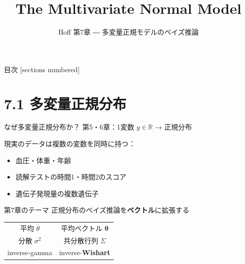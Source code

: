 \documentclass[lualatex,aspectratio=169,12pt]{beamer}
\title{The Multivariate Normal Model}
\subtitle{Hoff 第7章 ― 多変量正規モデルのベイズ推論}
\author{}
\date{}
\institute{}
\begin{document}
\maketitle

\begin{frame}{目次}
  [sections numbered]
  \tableofcontents
\end{frame}

\section{7.1 多変量正規分布}

\begin{frame}{なぜ多変量正規分布か？}
  第5・6章：1変数 $y \in \mathbb{R}$ → 正規分布

  \bigskip
  現実のデータは\alert{複数の変数}を同時に持つ：
  \begin{itemize}
    \item 血圧・体重・年齢
    \item 読解テストの時間1・時間2のスコア
    \item 遺伝子発現量の複数遺伝子
  \end{itemize}

  \bigskip
  \begin{block}{第7章のテーマ}
    正規分布のベイズ推論を\textbf{ベクトル}に拡張する
  \end{block}

  \vspace{0.3em}
  \begin{center}
  \begin{tabular}{c@{\quad$\to$\quad}c}
    平均 $\theta$ & 平均ベクトル $\bm{\theta}$ \\
    分散 $\sigma^2$ & 共分散行列 $\Sigma$ \\
    inverse-gamma & inverse-\textbf{Wishart} \\
  \end{tabular}
  \end{center}
\end{frame}
\end{document}

